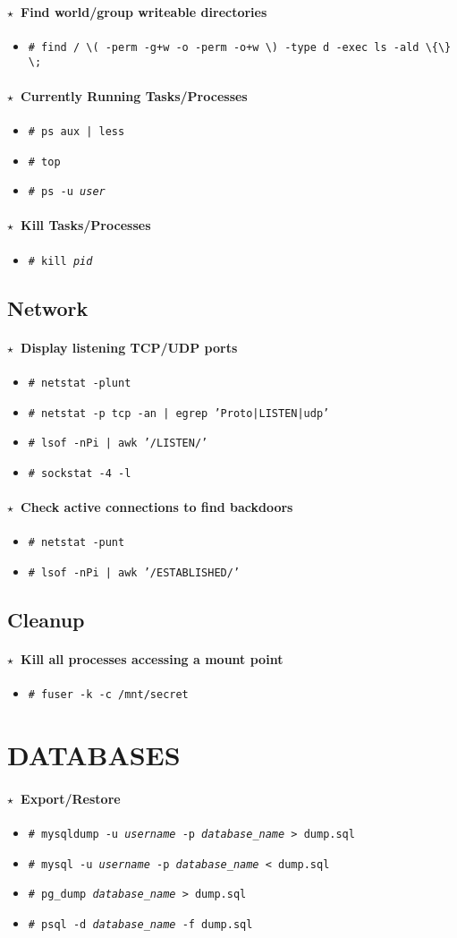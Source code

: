 \documentclass[10pt,landscape]{article}
\newcommand{\os}[1]{\texttt{\footnotesize{#1}}}
\newcommand{\unix}{\os{U}}
\newcommand{\freebsd}{\os{F}}
\newcommand{\bsd}{\os{B}}
\newcommand{\linux}{\os{L}}
\newenvironment{action}[1]
  {\paragraph{$\star$~#1}\begin{itemize}[leftmargin=1cm]}
  {\end{itemize}}
\newcommand{\cmd}[2]{\item[#1] {\small\tt\# #2}}
\newcommand{\app}[1]{\footnotesize\sc{#1}}
\begin{document}
\begin{multicols*}{3}
\begin{action}{Find world/group writeable directories}
\cmd{\unix}{find / \textbackslash( -perm -g+w -o -perm -o+w \textbackslash)
  -type d -exec ls -ald \textbackslash\{\textbackslash\} \textbackslash;}
\end{action}

\begin{action}{Currently Running Tasks/Processes}
\cmd{\linux\unix}{ps aux | less}
\cmd{\linux\unix}{top}
\cmd{\linux\unix}{ps -u \emph{user}}
\end{action}

\begin{action}{Kill Tasks/Processes}
\cmd{\linux\unix}{kill \emph{pid}}
\end{action}

\subsection*{Network}

\begin{action}{Display listening TCP/UDP ports}
\cmd{\linux\unix}{netstat -plunt}
\cmd{\bsd}{netstat -p tcp -an | egrep 'Proto|LISTEN|udp'}
\cmd{\unix}{lsof -nPi | awk '/LISTEN/'}
\cmd{\freebsd}{sockstat -4 -l}
\end{action}

\begin{action}{Check active connections to find backdoors}
\cmd{\linux}{netstat -punt}
\cmd{\unix}{lsof -nPi | awk '/ESTABLISHED/'}
\end{action}

\subsection*{Cleanup}

\begin{action}{Kill all processes accessing a mount point}
\cmd{\unix}{fuser -k -c /mnt/secret}
\end{action}

\section*{DATABASES}

\newcommand{\mysql}{\app{mysql}}
\newcommand{\postgres}{\app{psql}}
\newcommand{\mssql}{\app{mssql}}

\begin{action}{Export/Restore}
\cmd{\unix}{mysqldump -u \emph{username} -p \emph{database\_name} > dump.sql}
\cmd{\unix}{mysql -u \emph{username} -p \emph{database\_name} < dump.sql}
\cmd{\unix}{pg\_dump \emph{database\_name} > dump.sql}
\cmd{\unix}{psql -d \emph{database\_name} -f dump.sql}
\end{action}


\end{multicols*}
\end{document}

